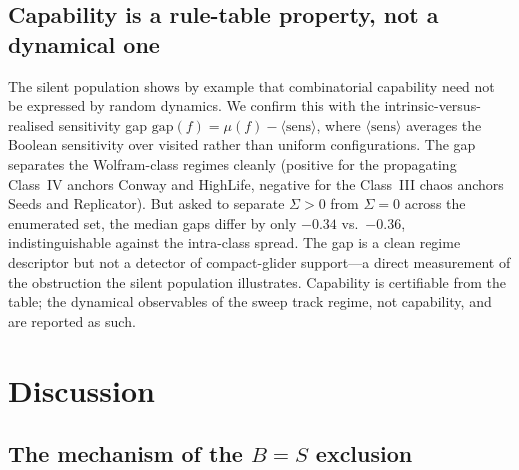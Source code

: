 \documentclass{article}
\begin{document}
\subsection{Capability is a rule-table property, not a dynamical one}
\label{sec:results-gap}

The silent population shows by example that combinatorial capability need not be
expressed by random dynamics. We confirm this with the intrinsic-versus-realised
sensitivity gap $\mathrm{gap}(f)=\mu(f)-\langle\mathrm{sens}\rangle$, where
$\langle\mathrm{sens}\rangle$ averages the Boolean sensitivity over visited rather
than uniform configurations. The gap separates the Wolfram-class regimes cleanly
(positive for the propagating Class~IV anchors Conway and HighLife, negative for
the Class~III chaos anchors Seeds and Replicator). But asked to separate
$\Sigma>0$ from $\Sigma=0$ across the enumerated set, the median gaps differ by
only $-0.34$ vs.\ $-0.36$, indistinguishable against the intra-class spread. The
gap is a clean regime descriptor but not a detector of compact-glider
support---a direct measurement of the obstruction the silent population
illustrates. Capability is certifiable from the table; the dynamical observables
of the sweep track regime, not capability, and are reported as such.

\section{Discussion}

\subsection{The mechanism of the $B=S$ exclusion}
\label{sec:disc-mechanism}
\end{document}
